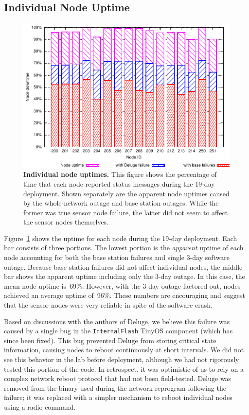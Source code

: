 \subsection{Individual Node Uptime}

\begin{figure}[t]
\begin{center}
\includegraphics[width=\hsize]{./5-evaluation/figs/robustness/nodesalive/node-uptime2.pdf}
\end{center}
\caption{\textbf{Individual node uptimes.}
This figure shows the percentage of time that each node reported status
messages during the 19-day deployment. Shown separately are the apparent node
uptimes caused by the whole-network outage and base station outages. While
the former was true sensor node failure, the latter did not seem to affect
the sensor nodes themselves.}
\label{evaluation-fig-nodeuptime}
\end{figure}

Figure~\ref{evaluation-fig-nodeuptime} shows the uptime for each node during
the 19-day deployment. Each bar consists of three portions. The lowest
portion is the \textit{apparent} uptime of each node accounting for both the
base station failures and single 3-day software outage. Because base station
failures did not affect individual nodes, the middle bar shows the apparent
uptime including only the 3-day outage. In this case, the mean node uptime
is~69\%. However, with the 3-day outage factored out, nodes achieved an
average uptime of~96\%. These numbers are encouraging and suggest that the
sensor nodes were very reliable in spite of the software crash.

Based on discussions with the authors of Deluge, we believe this failure was
caused by a single bug in the \texttt{InternalFlash} TinyOS component (which
has since been fixed). This bug prevented Deluge from storing critical state
information, causing nodes to reboot continuously at short intervals. We did
not see this behavior in the lab before deployment, although we had not
rigorously tested this portion of the code. In retrospect, it was optimistic
of us to rely on a complex network reboot protocol that had not been
field-tested.  Deluge was removed from the binary used during the network
reprogram following the failure; it was replaced with a simpler mechanism to
reboot individual nodes using a radio command.

